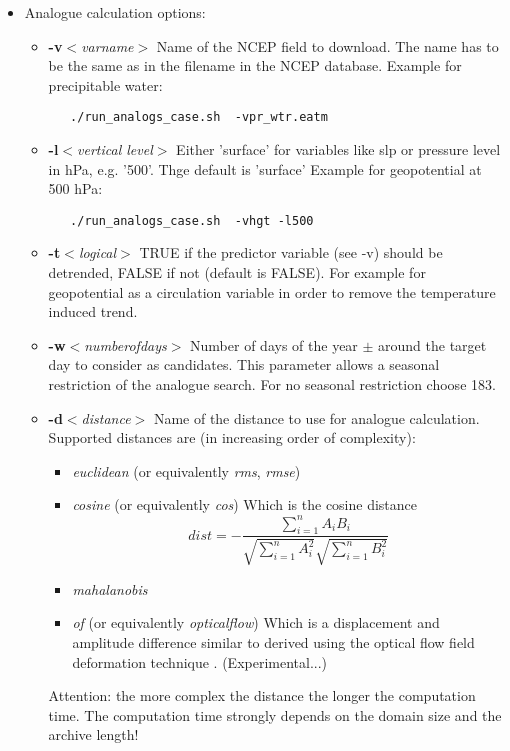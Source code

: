 \documentclass[11p,a4paper]{article}
\begin{document}
\begin{itemize}
 \item Analogue calculation options:
 \begin{itemize}
  \item \textbf{-v}\textit{$<$varname$>$} Name of the NCEP field to download. The name has to be the same as in the filename in the NCEP database.
  Example for precipitable water:
  \begin{verbatim}
   ./run_analogs_case.sh  -vpr_wtr.eatm
  \end{verbatim}
  \item \textbf{-l}\textit{$<$vertical level$>$} Either 'surface' for variables like slp or pressure level in hPa, e.g. '500'. Thge default is 'surface'
  Example for geopotential at 500 hPa:
  \begin{verbatim}
   ./run_analogs_case.sh  -vhgt -l500
  \end{verbatim}
  \item \textbf{-t}\textit{$<$logical$>$} TRUE if the predictor variable (see -v) should be detrended, FALSE if not (default is FALSE). For example for geopotential as a circulation variable in order to remove the temperature induced trend.
  \item \textbf{-w}\textit{$<$numberofdays$>$} Number of days of the year $\pm$ around the target day to consider as candidates. This parameter allows a seasonal restriction of the analogue search. For no seasonal restriction choose 183.
  \item \textbf{-d}\textit{$<$distance$>$} Name of the distance to use for analogue calculation. Supported distances are (in increasing order of complexity):
  \begin{itemize}
   \item \textit{euclidean} (or equivalently \textit{rms}, \textit{rmse})
   \item \textit{cosine} (or equivalently \textit{cos}) Which is the cosine distance \[dist = - \frac{\sum_{i=1}^n A_i B_i}{\sqrt{\sum_{i=1}^n A_i^2} \sqrt{\sum_{i=1}^n B_i^2}}\]
   \item \textit{mahalanobis}
   \item \textit{of}  (or equivalently \textit{opticalflow}) Which is a displacement and amplitude difference similar to \cite{keil09a} derived using the optical flow field deformation technique \citep{marzban10a}. (Experimental...)
  \end{itemize}
  Attention: the more complex the distance the longer the computation time. The computation time strongly depends on the domain size and the archive length!

\end{itemize}
\end{itemize}
\end{document}

